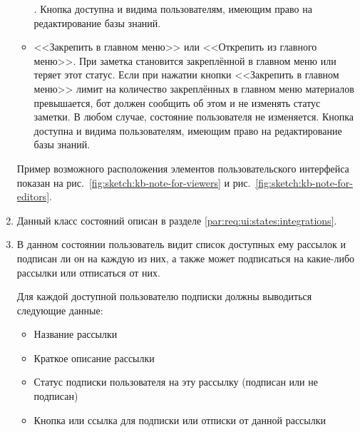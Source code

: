 \begin{enumerate}
\begin{itemize}
                        {}.
                        Кнопка доступна и видима пользователям, имеющим право на редактирование базы знаний.
                    \item
                        <<Закрепить в главном меню>> или <<Открепить из главного меню>>.
                        При  заметка становится закреплённой в главном меню или теряет этот
                        статус. Если при нажатии кнопки <<Закрепить в главном меню>> лимит на количество
                        закреплённых в главном меню материалов превышается, бот должен сообщить об
                        этом и не изменять статус заметки. В любом случае, состояние пользователя
                        не изменяется.
                        Кнопка доступна и видима пользователям, имеющим право на редактирование базы знаний.
                \end{itemize}

                Пример возможного расположения элементов пользовательского интерфейса показан на
                рис.~\ref{fig:sketch:kb-note-for-viewers} и
                рис.~\ref{fig:sketch:kb-note-for-editors}.

            \item \label{itm:req:ui:states:integrationx}

                Данный класс состояний описан в разделе \ref{par:req:ui:states:integrations}.

            \item \label{itm:req:ui:states:subscriptions}

                В данном состоянии пользователь видит список доступных ему рассылок и подписан ли
                он на каждую из них, а также может подписаться на какие-либо рассылки или отписаться
                от них.

                Для каждой доступной пользователю подписки должны выводиться
                следующие данные:
                \begin{itemize}
                    \item
                        Название рассылки
                    \item
                        Краткое описание рассылки
                    \item
                        Статус подписки пользователя на эту рассылку (подписан или не подписан)
                    \item
                        Кнопка или ссылка для подписки или отписки от данной рассылки
                \end{itemize}


\end{enumerate}
